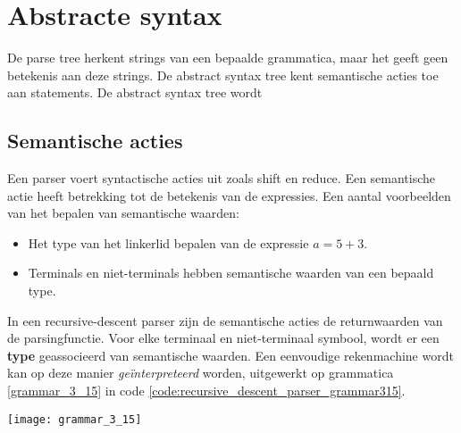 \chapter{Abstracte syntax}
\label{ch:abstract_syntax}
De parse tree herkent strings van een bepaalde grammatica, maar het geeft geen betekenis aan deze strings. De abstract syntax tree kent semantische acties toe aan statements. De abstract syntax tree wordt 
\section{Semantische acties}


Een parser voert syntactische acties uit zoals shift en reduce. Een semantische actie heeft betrekking tot de betekenis van de expressies. Een aantal voorbeelden van het bepalen van semantische waarden:
\begin{itemize}
	\item Het type van het linkerlid bepalen van de expressie $a = 5 + 3$.
	\item Terminals en niet-terminals hebben semantische waarden van een bepaald type.
\end{itemize}

In een recursive-descent parser zijn de semantische acties de returnwaarden van de parsingfunctie. Voor elke terminaal en niet-terminaal symbool, wordt er een \textbf{type} geassocieerd van semantische waarden. Een eenvoudige rekenmachine wordt kan op deze manier \textit{geïnterpreteerd} worden, uitgewerkt op grammatica \ref{grammar_3_15} in code \ref{code:recursive_descent_parser_grammar315}.
\begin{grammarfigure}
	\texttt{[image: grammar\_3\_15]}
	\caption{}
	\label{grammar_3_15}
\end{grammarfigure}


